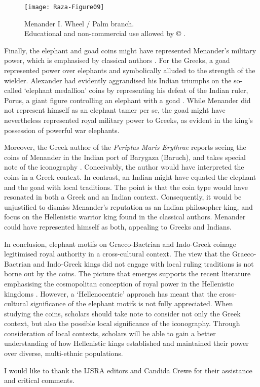 \documentclass{ijsra}
\def\coinindia{Educational and non-commercial use allowed by © \cite{Coin}.}
\begin{document}
\begin{figure}[!htb] %
	\centering
	\texttt{[image: Raza-Figure09]}
	\caption{Menander I. Wheel / Palm branch.
		{\normalfont\scriptsize \\ \coinindia}}
	\label{fig:Raza-Figure09}
\end{figure}

Finally, the elephant and goad coins might have represented Menander’s military power, which is emphasised by classical authors \parencite[644]{Mairs2015}.
For the Greeks, a goad represented power over elephants and symbolically alluded to the strength of the wielder.
Alexander had evidently aggrandised his Indian triumphs on the so-called ‘elephant medallion’ coins by representing his defeat of the Indian ruler, Porus, a giant figure controlling an elephant with a goad \parencites[151--152]{Holt2003}[204--205]{Stewart1993}.
While Menander did not represent himself as an elephant tamer per se, the goad might have nevertheless represented royal military power to Greeks, as evident in the king’s possession of powerful war elephants. 

Moreover, the Greek author of the \emph{Periplus Maris Erythrae} reports seeing the coins of Menander in the Indian port of Barygaza (Baruch), and takes special note of the iconography .
Conceivably, the author would have interpreted the coins in a Greek context. In contrast, an Indian might have equated the elephant and the goad with local traditions.
The point is that the coin type would have resonated in both a Greek and an Indian context.
Consequently, it would be unjustified to dismiss Menander’s reputation as an Indian philosopher king, and focus on the Hellenistic warrior king found in the classical authors.
Menander could have represented himself as both, appealing to Greeks and Indians.

In conclusion, elephant motifs on Graeco-Bactrian and Indo-Greek coinage legitimised royal authority in a cross-cultural context.
The view that the Graeco-Bactrian and Indo-Greek kings did not engage with local ruling traditions is not borne out by the coins.
The picture that emerges supports the recent literature emphasising the cosmopolitan conception of royal power in the Hellenistic kingdoms \parencite[11]{Strootman2014}.
However, a ‘Hellenocentric’ approach has meant that the cross-cultural significance of the elephant motifs is not fully appreciated.
When studying the coins, scholars should take note to consider not only the Greek context, but also the possible local significance of the iconography.
Through consideration of local contexts, scholars will be able to gain a better understanding of how Hellenistic kings established and maintained their power over diverse, multi-ethnic populations.

\IJSRAseparator
I  would like to thank the IJSRA editors and Candida Crewe for their assistance and critical comments.
\IJSRAclosing%
\end{document}
